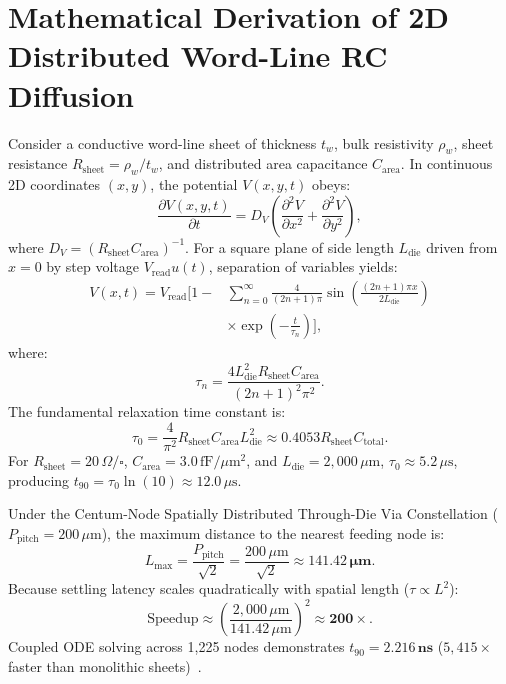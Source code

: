 \documentclass[journal]{IEEEtran}
\begin{document}
\appendices

\section{Mathematical Derivation of 2D Distributed Word-Line RC Diffusion}
Consider a conductive word-line sheet of thickness $t_w$, bulk resistivity $\rho_w$, sheet resistance $R_{\text{sheet}} = \rho_w / t_w$, and distributed area capacitance $C_{\text{area}}$. In continuous 2D coordinates $(x, y)$, the potential $V(x, y, t)$ obeys:
\begin{equation}
    \frac{\partial V(x, y, t)}{\partial t} = D_V \left( \frac{\partial^2 V}{\partial x^2} + \frac{\partial^2 V}{\partial y^2} \right),
\end{equation}
where $D_V = (R_{\text{sheet}} C_{\text{area}})^{-1}$. For a square plane of side length $L_{\text{die}}$ driven from $x = 0$ by step voltage $V_{\text{read}} u(t)$, separation of variables yields:
\begin{align}
    V(x, t) = V_{\text{read}} \Bigg[ 1 - &\sum_{n=0}^{\infty} \frac{4}{(2n+1)\pi} \sin\left(\frac{(2n+1)\pi x}{2 L_{\text{die}}}\right) \nonumber \\
    &\times \exp\left(-\frac{t}{\tau_n}\right) \Bigg],
\end{align}
where:
\begin{equation}
    \tau_n = \frac{4 L_{\text{die}}^2 R_{\text{sheet}} C_{\text{area}}}{(2n+1)^2 \pi^2}.
\end{equation}
The fundamental relaxation time constant is:
\begin{equation}
    \tau_0 = \frac{4}{\pi^2} R_{\text{sheet}} C_{\text{area}} L_{\text{die}}^2 \approx 0.4053 R_{\text{sheet}} C_{\text{total}}.
\end{equation}
For $R_{\text{sheet}} = 20\,\Omega/\square$, $C_{\text{area}} = 3.0\,\text{fF}/\mu\text{m}^2$, and $L_{\text{die}} = 2,000\,\mu\text{m}$, $\tau_0 \approx 5.2\,\mu\text{s}$, producing $t_{90} = \tau_0 \ln(10) \approx 12.0\,\mu\text{s}$.

Under the Centum-Node Spatially Distributed Through-Die Via Constellation ($P_{\text{pitch}} = 200\,\mu\text{m}$), the maximum distance to the nearest feeding node is:
\begin{equation}
    L_{\max} = \frac{P_{\text{pitch}}}{\sqrt{2}} = \frac{200\,\mu\text{m}}{\sqrt{2}} \approx \mathbf{141.42\,\mu\text{m}}.
\end{equation}
Because settling latency scales quadratically with spatial length ($\tau \propto L^2$):
\begin{equation}
    \text{Speedup} \approx \left( \frac{2,000\,\mu\text{m}}{141.42\,\mu\text{m}} \right)^2 \approx \mathbf{200\times}.
\end{equation}
Coupled ODE solving across 1,225 nodes demonstrates $t_{90} = \mathbf{2.216\,\text{ns}}$ ($5,415\times$ faster than monolithic sheets)~\cite{omi_sim_report}.
\end{document}
